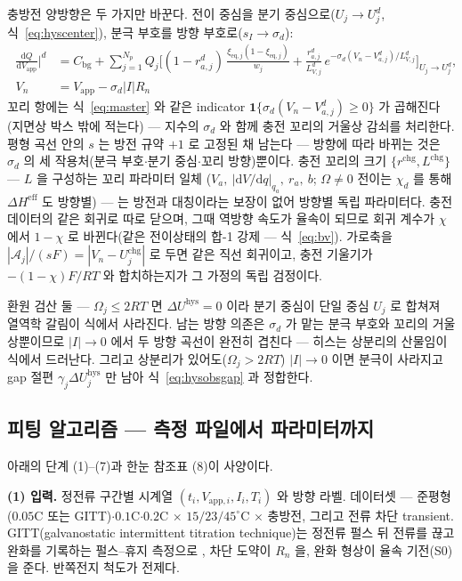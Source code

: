 \documentclass[11pt,a4paper]{article}
\newcommand{\dd}{\mathrm{d}}
\newcommand{\eff}{\mathrm{eff}}
\newcommand{\eq}{\mathrm{eq}}
\newcommand{\app}{\mathrm{app}}
\newcommand{\bg}{\mathrm{bg}}
\newcommand{\chg}{\mathrm{chg}}
\newcommand{\hys}{\mathrm{hys}}
\begin{document}
충방전 양방향은 두 가지만 바꾼다. 전이 중심을 분기 중심으로($U_j\to U_j^{d}$,
식~\eqref{eq:hyscenter}), 분극 부호를 방향 부호로($s_I\to\sigma_d$):
\begin{equation}
\boxed{\;\begin{aligned}\frac{\dd Q}{\dd V_\app}\Big|^{d}&=C_\bg+\sum_{j=1}^{N_p}Q_j\bigg[
(1-r_{a,j}^d)\,\frac{\xi_{\eq,j}(1-\xi_{\eq,j})}{w_j}
+\frac{r_{a,j}^d}{L_{V,j}^d}\,e^{-\sigma_d(V_n-V_{a,j}^d)/L_{V,j}^d}\bigg]_{U_j\to U_j^{d}},\\[2pt]
V_n&=V_\app-\sigma_d|I|R_n\end{aligned}\;}
\label{eq:hysmaster}
\end{equation}
꼬리 항에는 식~\eqref{eq:master} 와 같은 indicator $\mathbf 1\{\sigma_d(V_n-V_{a,j}^d)\ge0\}$
가 곱해진다(지면상 박스 밖에 적는다) — 지수의 $\sigma_d$ 와 함께 충전 꼬리의 거울상 감쇠를 처리한다.
평형 곡선 안의 $s$ 는 방전 규약 $+1$ 로 고정된 채 남는다 — 방향에 따라 바뀌는 것은 $\sigma_d$ 의 세
작용처(분극 부호$\cdot$분기 중심$\cdot$꼬리 방향)뿐이다. 충전 꼬리의 크기 $\{r^{\chg},L^{\chg}\}$ — $L$ 을 구성하는 꼬리 파라미터 일체
($V_a,\ |\dd V/\dd q|_{q_a},\ r_a,\ b$; $\Omega\ne0$ 전이는 $\chi_d$ 를 통해
$\Delta H^{\eff}$ 도 방향별) — 는 방전과 대칭이라는 보장이 없어 방향별 독립 파라미터다. 충전 데이터의 같은 회귀로 따로 닫으며, 그때 역방향 속도가 율속이 되므로 회귀 계수가
$\chi$ 에서 $1-\chi$ 로 바뀐다(같은 전이상태의 합-1 강제 — 식~\eqref{eq:bv}). 가로축을 $|\mathcal A_j|/(sF)=|V_n-U_j^{\chg}|$ 로 두면 같은 직선 회귀이고,
충전 기울기가 $-(1-\chi)F/RT$ 와 합치하는지가 그 가정의 독립 검정이다.

환원 검산 둘 — $\Omega_j\le2RT$ 면 $\Delta U^\hys=0$ 이라 분기 중심이 단일 중심 $U_j$ 로 합쳐져
열역학 갈림이 식에서 사라진다. 남는 방향 의존은 $\sigma_d$ 가 맡는 분극 부호와 꼬리의 거울상뿐이므로
$|I|\to0$ 에서 두 방향 곡선이 완전히 겹친다 — 히스는 상분리의 산물임이 식에서 드러난다. 그리고 상분리가
있어도($\Omega_j>2RT$) $|I|\to0$ 이면 분극이 사라지고 gap 절편 $\gamma_j\Delta U_j^\hys$ 만 남아
식~\eqref{eq:hysobsgap} 과 정합한다.

\subsection{피팅 알고리즘 — 측정 파일에서 파라미터까지}
아래의 단계 (1)--(7)과 한눈 참조표 (8)이 사양이다.

\textbf{(1) 입력.} 정전류 구간별 시계열 $(t_i,V_{\app,i},I_i,T_i)$ 와 방향 라벨. 데이터셋 — 준평형
($0.05$C 또는 GITT)$\cdot$$0.1$C$\cdot$$0.2$C $\times$ $15/23/45^\circ$C $\times$ 충방전, 그리고 전류
차단 transient. GITT(galvanostatic intermittent titration technique)는 정전류 펄스 뒤 전류를 끊고 완화를
기록하는 펄스--휴지 측정으로 \cite{weppner1977}, 차단 도약이 $R_n$ 을, 완화 형상이 율속 기전(S0)을 준다.
반쪽전지 척도가 전제다.
\end{document}
